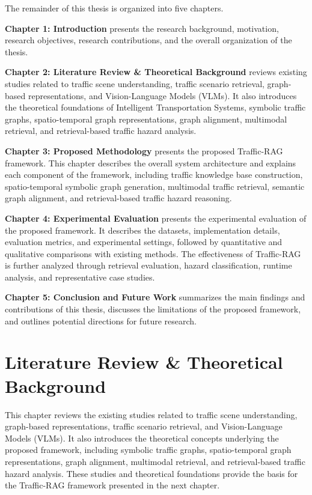 \documentclass[a4paper, 11pt]{article} %
\begin{document}
The remainder of this thesis is organized into five chapters.

\textbf{Chapter 1: Introduction} presents the research background, motivation, research objectives, research contributions, and the overall organization of the thesis.

\textbf{Chapter 2: Literature Review \& Theoretical Background} reviews existing studies related to traffic scene understanding, traffic scenario retrieval, graph-based representations, and Vision-Language Models (VLMs). It also introduces the theoretical foundations of Intelligent Transportation Systems, symbolic traffic graphs, spatio-temporal graph representations, graph alignment, multimodal retrieval, and retrieval-based traffic hazard analysis.

\textbf{Chapter 3: Proposed Methodology} presents the proposed Traffic-RAG framework. This chapter describes the overall system architecture and explains each component of the framework, including traffic knowledge base construction, spatio-temporal symbolic graph generation, multimodal traffic retrieval, semantic graph alignment, and retrieval-based traffic hazard reasoning.

\textbf{Chapter 4: Experimental Evaluation} presents the experimental evaluation of the proposed framework. It describes the datasets, implementation details, evaluation metrics, and experimental settings, followed by quantitative and qualitative comparisons with existing methods. The effectiveness of Traffic-RAG is further analyzed through retrieval evaluation, hazard classification, runtime analysis, and representative case studies.

\textbf{Chapter 5: Conclusion and Future Work} summarizes the main findings and contributions of this thesis, discusses the limitations of the proposed framework, and outlines potential directions for future research.
\newpage
\section{Literature Review \& Theoretical Background}

This chapter reviews the existing studies related to traffic scene understanding, graph-based representations, traffic scenario retrieval, and Vision-Language Models (VLMs). It also introduces the theoretical concepts underlying the proposed framework, including symbolic traffic graphs, spatio-temporal graph representations, graph alignment, multimodal retrieval, and retrieval-based traffic hazard analysis. These studies and theoretical foundations provide the basis for the Traffic-RAG framework presented in the next chapter.
\end{document}
